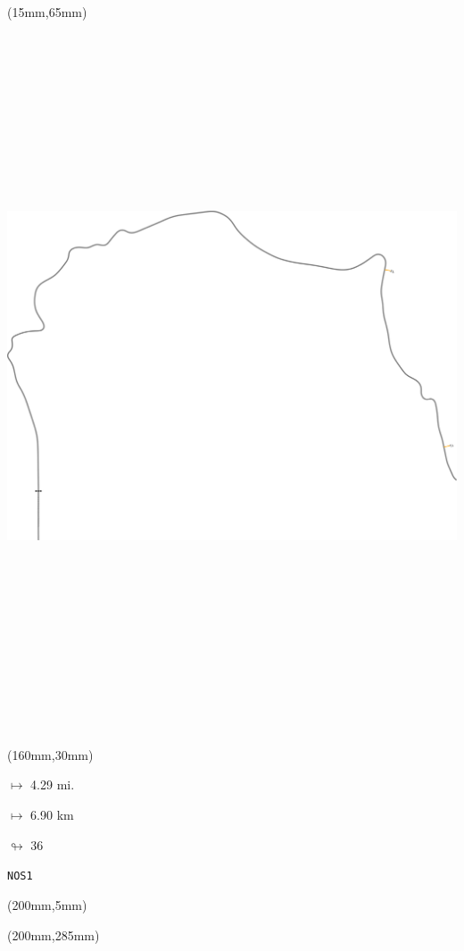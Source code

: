 \begin{textblock*}{185mm}(15mm,65mm)%
\centering
\mbox{\includegraphics[width=185mm,height=210mm,keepaspectratio]{PT/NOS1.pdf}}
\end{textblock*}
\begin{textblock*}{40mm}(160mm,30mm)%
\Large
\par$\mapsto$ 4.29 mi.
\par$\mapsto$ 6.90 km
\par$\looparrowright$ 36
\par\hfill\tiny\tt NOS1\\
\end{textblock*}
\begin{textblock*}{20mm}(200mm,5mm)%
\fbox{\thepage}
\label{NOS1}
\end{textblock*}
\begin{textblock*}{20mm}(200mm,285mm)%
\fbox{\thepage}
\end{textblock*}

